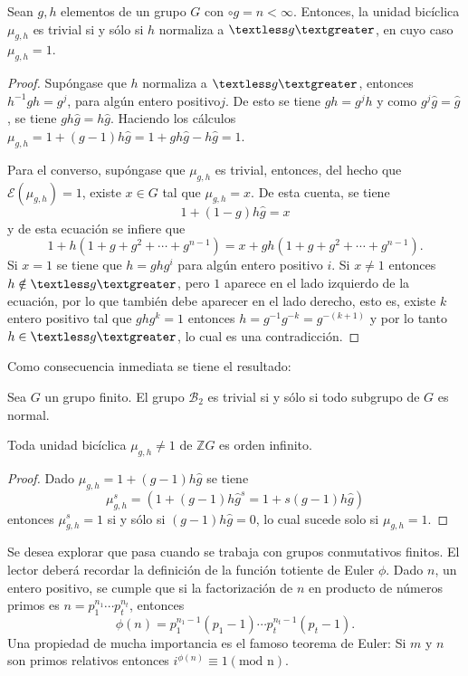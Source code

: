 \begin{proposicion}\label{prop:unidadesb}
Sean $g,h$ elementos de un grupo $G$ con $\circ g = n < \infty$. Entonces, la unidad bicíclica $\mu_{g,h}$ es trivial si y sólo si $h$ normaliza a $\textless g \textgreater$, en cuyo caso $\mu_{g,h} = 1$.
\end{proposicion}
\begin{proof}
Supóngase que $h$ normaliza a $\textless g \textgreater$, entonces $h^{-1}gh = g^j$, para algún entero positivo$j$. De esto se tiene $gh = g^jh$ y como $g^j\hat{g} = \hat{g}$, se tiene $gh\hat{g} = h\hat{g}$. Haciendo los cálculos $\mu_{g,h} = 1+(g-1)h\hat{g}= 1+gh\hat{g}-h\hat{g} =1$.

Para el converso, supóngase que $\mu_{g,h}$ es trivial, entonces, del hecho que $\mathcal{E}(\mu_{g,h})=1$, existe $x \in G$ tal que $\mu_{g,h}=x$. De esta cuenta, se tiene
\[ 1+(1-g)h\hat{g} = x \] y de esta ecuación se infiere que \[ 1+ h(1+g+g^2+\cdots + g^{n-1}) = x +gh(1+g+g^2+\cdots+g^{n-1}).  \] Si $x=1$ se tiene que $h=ghg^i$ para algún entero positivo $i$. Si $x \neq 1$ entonces $h \notin \textless g \textgreater$, pero $1$ aparece en el lado izquierdo de la ecuación, por lo que también debe aparecer en el lado derecho, esto es, existe $k$ entero positivo tal que $ghg^k = 1$ entonces $h = g^{-1}g^{-k}= g^{-(k+1)}$ y por lo tanto $h \in \textless g \textgreater$, lo cual es una contradicción. 
\end{proof}
Como consecuencia inmediata se tiene el resultado:
\begin{proposicion}
Sea $G$ un grupo finito. El grupo $\mathcal{B}_2$ es trivial si y sólo si todo subgrupo de $G$ es normal.
\end{proposicion}
\begin{proposicion}
Toda unidad bicíclica $\mu_{g,h} \neq 1$ de $\mathds{Z}G$ es orden infinito. 
\end{proposicion}
\begin{proof}
Dado $\mu_{g,h} = 1 +(g-1)h\hat{g}$ se tiene
\[  \mu_{g,h}^s = (1+(g-1)h\hat{g}^s = 1+s(g-1)h\hat{g})  \] entonces $\mu_{g,h}^s = 1$ si y sólo si $(g-1)h\hat{g} = 0$, lo cual sucede solo si $\mu_{g,h} = 1$.
\end{proof}
Se desea explorar que pasa cuando se trabaja con grupos conmutativos finitos. El lector deberá recordar la definición de la función totiente de Euler $\phi$. 
Dado $n$, un entero positivo, se cumple que si la factorización de $n$ en producto de números primos es $n = p_1^{n_1}\cdots p_t^{n_t}$, entonces \[ \phi(n) = p_1^{n_1-1}(p_1-1)\cdots p_t^{n_t-1}(p_t-1).  \] Una propiedad de mucha importancia es el famoso teorema de Euler: Si $m$ y $n$ son primos relativos entonces $i^{\phi(n)} \equiv 1 (\mbox{mod n}).$
